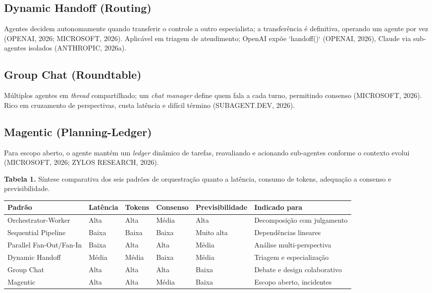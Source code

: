 \documentclass[12pt,a4paper]{article}
\begin{document}
\subsection{Dynamic Handoff (Routing)}

Agentes decidem autonomamente quando transferir o controle a outro especialista; a transferência é definitiva, operando um agente por vez (OPENAI, 2026; MICROSOFT, 2026). Aplicável em triagem de atendimento; OpenAI expõe `handoff()` (OPENAI, 2026), Claude via sub-agentes isolados (ANTHROPIC, 2026a).

\subsection{Group Chat (Roundtable)}

Múltiplos agentes em \textit{thread} compartilhado; um \textit{chat manager} define quem fala a cada turno, permitindo consenso (MICROSOFT, 2026). Rico em cruzamento de perspectivas, custa latência e difícil término (SUBAGENT.DEV, 2026).

\subsection{Magentic (Planning-Ledger)}

Para escopo aberto, o agente mantém um \textit{ledger} dinâmico de tarefas, reavaliando e acionando sub-agentes conforme o contexto evolui (MICROSOFT, 2026; ZYLOS RESEARCH, 2026).

\textbf{Tabela 1.} Síntese comparativa dos seis padrões de orquestração quanto a latência, consumo de tokens, adequação a consenso e previsibilidade.

\begin{center}
{\footnotesize
\setlength{\tabcolsep}{4pt}
\begin{tabularx}{\linewidth}{>{\raggedright\arraybackslash}X>{\centering\arraybackslash}X>{\centering\arraybackslash}X>{\centering\arraybackslash}X>{\centering\arraybackslash}X>{\raggedright\arraybackslash}X}
\toprule
\textbf{Padrão} & \textbf{Latência} & \textbf{Tokens} & \textbf{Consenso} & \textbf{Previsibilidade} & \textbf{Indicado para} \\
\midrule
Orchestrator-Worker & Alta & Alta & Média & Alta & Decomposição com julgamento \\
Sequential Pipeline & Baixa & Baixa & Baixa & Muito alta & Dependências lineares \\
Parallel Fan-Out/Fan-In & Baixa & Alta & Alta & Média & Análise multi-perspectiva \\
Dynamic Handoff & Média & Média & Baixa & Média & Triagem e especialização \\
Group Chat & Alta & Alta & Alta & Baixa & Debate e design colaborativo \\
Magentic & Alta & Alta & Média & Baixa & Escopo aberto, incidentes \\
\bottomrule
\end{tabularx}
}
\end{center}
\end{document}
